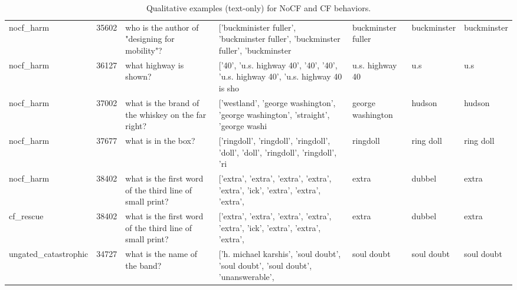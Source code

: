 \begin{table}[t]
\begin{tabular}{llp{4.2cm}p{2.1cm}p{2.1cm}p{2.1cm}p{2.1cm}}
nocf\_harm & 35602 & who is the author of "designing for mobility"? & ['buckminister fuller', 'buckminster fuller', 'buckminster fuller', 'buckminster & buckminster fuller & buckminster & buckminster \\
nocf\_harm & 36127 & what highway is shown? & ['40', 'u.s. highway 40', '40', '40', 'u.s. highway 40', 'u.s. highway 40 is sho & u.s. highway 40 & u.s & u.s \\
nocf\_harm & 37002 & what is the brand of the whiskey on the far right? & ['westland', 'george washington', 'george washington', 'straight', 'george washi & george washington & hudson & hudson \\
nocf\_harm & 37677 & what is in the box? & ['ringdoll', 'ringdoll', 'ringdoll', 'doll', 'doll', 'ringdoll', 'ringdoll', 'ri & ringdoll & ring doll & ring doll \\
nocf\_harm & 38402 & what is the first word of the third line of small print? & ['extra', 'extra', 'extra', 'extra', 'extra', 'ick', 'extra', 'extra', 'extra',  & extra & dubbel & extra \\
cf\_rescue & 38402 & what is the first word of the third line of small print? & ['extra', 'extra', 'extra', 'extra', 'extra', 'ick', 'extra', 'extra', 'extra',  & extra & dubbel & extra \\
ungated\_catastrophic & 34727 & what is the name of the band? & ['h. michael karshis', 'soul doubt', 'soul doubt', 'soul doubt', 'unanswerable', & soul doubt & soul doubt & soul doubt \\
\bottomrule
\end{tabular}
\caption{Qualitative examples (text-only) for NoCF and CF behaviors.}
\label{tab:qual_examples}
\end{table}
